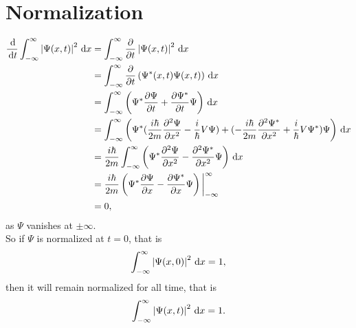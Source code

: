 \documentclass[en, oneside]{vivi}
\begin{document}
\section{Normalization}
\begin{align}
    \frac{\dif}{\dif t}\int_{-\infty}^{\infty} \left\lvert \Psi(x,t) \right\rvert^2 \dif x &= 
    \int_{-\infty}^{\infty} \frac{\partial}{\partial t} \left\lvert \Psi(x,t) \right\rvert^2 \dif x\\
    &= \int_{-\infty}^{\infty} \frac{\partial}{\partial t} \left( \Psi^*(x,t)\Psi(x,t) \right) \dif x\\
    &= \int_{-\infty}^{\infty} \left( \Psi^*\frac{\partial \Psi}{\partial t} + \frac{\partial \Psi^*}{\partial t}\Psi \right) \dif x\\
    &= \int_{-\infty}^{\infty} \left( \Psi^* (\frac{i \hbar}{2m} \frac{\partial^2 \Psi}{\partial x^2} - \frac{i}{\hbar} V\Psi) +
    (-\frac{i \hbar}{2m} \frac{\partial^2 \Psi^*}{\partial x^2} + \frac{i}{\hbar} V\Psi^*)\Psi \right) \dif x\\
    &= \frac{i \hbar}{2m} \int_{-\infty}^{\infty} \left( \Psi^* \frac{\partial^2 \Psi}{\partial x^2} - \frac{\partial^2 \Psi^*}{\partial x^2}\Psi \right) \dif x\\
    &= \frac{i \hbar}{2m} \left( \Psi^* \frac{\partial \Psi}{\partial x} - \frac{\partial \Psi^*}{\partial x}\Psi \right)\bigg|_{-\infty}^{\infty}\\
    &= 0,
\end{align}
as $\Psi$ vanishes at $\pm \infty$.\\
So if $\Psi$ is normalized at $t=0$, that is
\begin{equation}
    \int_{-\infty}^{\infty} \left\lvert \Psi(x,0) \right\rvert^2 \dif x = 1,
\end{equation}
then it will remain normalized for all time, that is
\begin{equation}
    \int_{-\infty}^{\infty} \left\lvert \Psi(x,t) \right\rvert^2 \dif x = 1.
\end{equation}
\end{document}
